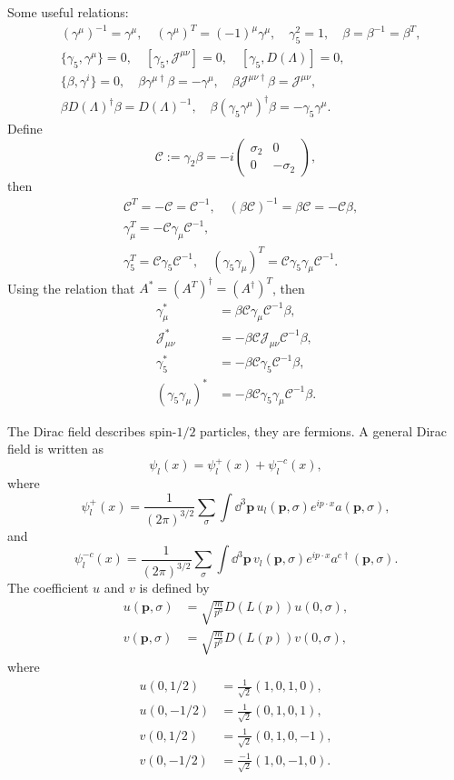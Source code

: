 \documentclass[8pt]{book}
\begin{document}
Some useful relations:
\[
\begin{split}
	&(\gamma^{\mu})^{-1}=\gamma^{\mu},\quad (\gamma^\mu)^T=(-1)^\mu \gamma^\mu, \quad \gamma_5^2=1,\quad \beta=\beta^{-1}=\beta^T,\\
	&\{\gamma_5,\gamma^\mu\}=0,\quad [\gamma_5,\mathscr{J}^{\mu\nu}]=0,\quad [\gamma_5,D(\Lambda)]=0,\\
	&\{\beta,\gamma^i\}=0,\quad\beta \gamma^{\mu\dag}\beta=-\gamma^{\mu},\quad \beta \mathscr{J}^{\mu\nu\dag}\beta=\mathscr{J}^{\mu\nu},\\
	&\beta D(\Lambda)^\dag \beta=D(\Lambda)^{-1}, \quad \beta (\gamma_5\gamma^{\mu})^\dag\beta=-\gamma_5\gamma^{\mu}.
\end{split}
\]
Define 
\[
	\mathscr{C}:=\gamma_2\beta=-i \begin{pmatrix}
		\sigma_2&0\\
		0&-\sigma_2
	\end{pmatrix},
\]
then 
\[
\begin{split}
	&\mathscr{C}^T=-\mathscr{C}=\mathscr{C}^{-1},\quad (\beta\mathscr{C})^{-1}=\beta\mathscr{C}=-\mathscr{C}\beta,\\
	&\gamma_\mu^T=-\mathscr{C}\gamma_\mu \mathscr{C}^{-1},\\
	&\gamma_5^T=\mathscr{C}\gamma_5 \mathscr{C}^{-1},\quad (\gamma_5\gamma_\mu)^T=\mathscr{C}\gamma_5\gamma_\mu \mathscr{C}^{-1}.
\end{split}
\]
Using the relation that $A^*=(A^T)^\dag=(A^\dag)^T$, then 
\[
\begin{split}
	\gamma_\mu^*&=\beta\mathscr{C}\gamma_\mu \mathscr{C}^{-1} \beta,\\
	\mathscr{J}_{\mu\nu}^*&=-\beta\mathscr{C}\mathscr{J}_{\mu\nu} \mathscr{C}^{-1} \beta,\\
	\gamma_5^*&=-\beta\mathscr{C}\gamma_5 \mathscr{C}^{-1}\beta,\\
	(\gamma_5\gamma_\mu)^*&=-\beta\mathscr{C}\gamma_5\gamma_\mu \mathscr{C}^{-1}\beta.
\end{split}
\]

The Dirac field describes spin-$1/2$ particles, they are fermions. A general Dirac field is written as
\[
	\psi_l(x)=\psi^+_l(x)+\psi^{-c}_l(x),
\]
where
\[
	\psi^+_l(x)=\frac{1}{(2\pi)^{3/2}}\sum_\sigma\int \dd^3\bm{p}\,u_l(\bm{p},\sigma)e^{ip\cdot x}a(\bm{p},\sigma),
\]
and
\[
	\psi^{-c}_l(x)=\frac{1}{(2\pi)^{3/2}}\sum_\sigma\int \dd^3\bm{p}\,v_l(\bm{p},\sigma)e^{ip\cdot x}a^{c\dag}(\bm{p},\sigma).
\]
The coefficient $u$ and $v$ is defined by
\begin{align*}
	u(\bm{p},\sigma)&=\sqrt{\frac{m}{p^0}}D(L(p))u(0,\sigma),\\
	v(\bm{p},\sigma)&=\sqrt{\frac{m}{p^0}}D(L(p))v(0,\sigma),
\end{align*}
where
\begin{align*}
	u(0,1/2)&=\frac{1}{\sqrt{2}}(1,0,1,0),\\
	u(0,-1/2)&=\frac{1}{\sqrt{2}}(0,1,0,1),\\
	v(0,1/2)&=\frac{1}{\sqrt{2}}(0,1,0,-1),\\
	v(0,-1/2)&=\frac{-1}{\sqrt{2}}(1,0,-1,0).
\end{align*}
\end{document}
